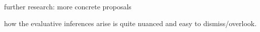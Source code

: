 \documentclass[12pt,letterpaper]{scrartcl}
\begin{document}
\begin{comment}
    \setlength{\SubExleftmargin}{2.4em}    
    \ex. \ag. ruguo Zhangsan bi Lisi hai gao, ta yinggai neng jin lanqiudui \\
		if Z. compared-to L. \textsc{hai} tall, he should able join basketball-team \\
		`If Zhangsan is even taller than Lisi, he should be able to join the basketball team.' \\
		\underline{Inference}: Lisi is tall by conventional(?) standard.
	\bg. ?ruguo Zhangsan bi Lisi, hai shi gao de, ta keyi shi-shi jiaru lanqiudui \\
		if Z. compared-to L. \textsc{hai} \textsc{cop} tall \textsc{de} he could try join basketball-team\\
		`If Zhangsan is at least taller than Lisi, he could try joining basketball team'\\
		\underline{Inference}: Lisi is short by conventional(?) standard.
    \bg. ?jishi Zhangsan bi Lisi, hai shi gao de, ta ye bu manzu lanqiudui de yaoqiu \\
		if Z. compared-to L. \textsc{hai} \textsc{cop} tall \textsc{de} he still(?) join not-\textsc{PERF} basketball-team\\
		`Even though Zhangsan is taller than Lisi, he still doesn't meet the requirement'
\end{comment}


further research: more concrete proposals 

how the evaluative inferences arise is quite nuanced and easy to dismiss/overlook.

\newpage
\printbibliography
\end{document}
